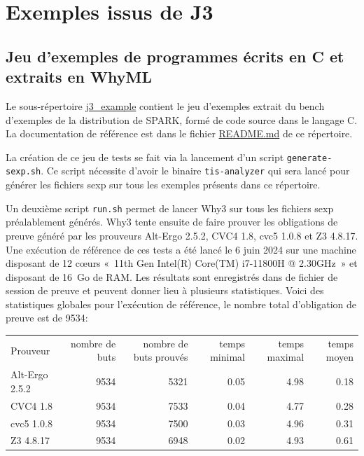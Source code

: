 \documentclass[a4paper,11pt]{article}
\begin{document}
\section{Exemples issus de J3}

\subsection{Jeu d'exemples de programmes écrits en C et extraits en WhyML}

Le sous-répertoire \url{j3_example} contient le jeu d'exemples extrait du bench
d'exemples de la distribution de SPARK, formé de code source dans le langage C.
La documentation de référence est dans le fichier \url{README.md} de ce
répertoire.

La création de ce jeu de tests se fait via la lancement d'un script
\verb/generate-sexp.sh/.
Ce script nécessite d'avoir le binaire \verb/tis-analyzer/ qui sera lancé
pour générer les fichiers sexp sur tous les exemples présents dans ce
répertoire.

Un deuxième script \verb/run.sh/ permet de lancer Why3 sur tous les fichiers
sexp préalablement générés. Why3 tente ensuite de faire prouver les obligations
de preuve généré par les prouveurs Alt-Ergo 2.5.2, CVC4 1.8, cvc5 1.0.8 et
Z3 4.8.17. Une exécution de référence de ces tests a été lancé le 6 juin 2024
sur une machine disposant de 12 c{\oe}urs «~11th Gen Intel(R) Core(TM) i7-11800H @ 2.30GHz~» et disposant de 16~Go de RAM.
Les résultats sont enregistrés dans de fichier de session de preuve et peuvent
donner lieu à plusieurs statistiques.
Voici des statistiques globales pour l'exécution de
référence, le nombre total d'obligation de preuve est de 9534:

\begin{center}
  \begin{tabular}{|l|r|r|r|r|r|}
    \hline
  \rowcolor{gray!50} Prouveur
  & \multicolumn{1}{p{0.13\textwidth}|}{nombre de buts}
  & \multicolumn{1}{p{0.13\textwidth}|}{nombre de buts prouvés}
  & \multicolumn{1}{p{0.13\textwidth}|}{temps minimal}
  & \multicolumn{1}{p{0.13\textwidth}|}{temps maximal}
  & \multicolumn{1}{p{0.13\textwidth}|}{temps moyen}
  \\
  Alt-Ergo 2.5.2                &  9534 & 5321 & 0.05 & 4.98 & 0.18 \\
  CVC4 1.8                      &  9534 & 7533 & 0.04 & 4.77 & 0.28 \\
  cvc5 1.0.8                    &  9534 & 7500 & 0.03 & 4.96 & 0.31 \\
  Z3 4.8.17                     &  9534 & 6948 & 0.02 & 4.93 & 0.61 \\
    \hline
\end{tabular}
\end{center}
\end{document}
